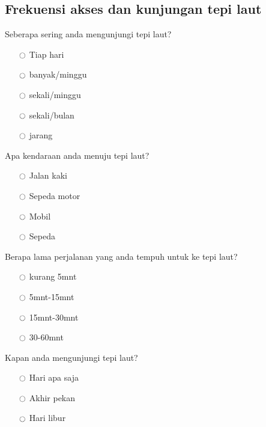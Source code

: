 \subsection*{Frekuensi akses dan kunjungan tepi laut}


Seberapa sering anda mengunjungi tepi laut?
\begin{multicols}{3}
\begin{itemize}
\item[$\ocircle$] Tiap hari
\item[$\ocircle$] banyak/minggu
\item[$\ocircle$] sekali/minggu
\item[$\ocircle$] sekali/bulan
\item[$\ocircle$] jarang
\end{itemize}
\end{multicols}

Apa kendaraan anda menuju tepi laut?
\begin{multicols}{3}
\begin{itemize}
\item[$\ocircle$] Jalan kaki
\item[$\ocircle$] Sepeda motor
\item[$\ocircle$] Mobil
\item[$\ocircle$] Sepeda
\end{itemize}
\end{multicols}

Berapa lama perjalanan yang anda tempuh untuk ke tepi laut?
\begin{multicols}{3}
\begin{itemize}
\item[$\ocircle$] kurang 5mnt
\item[$\ocircle$] 5mnt-15mnt
\item[$\ocircle$] 15mnt-30mnt
\item[$\ocircle$] 30-60mnt
\end{itemize}
\end{multicols}


Kapan anda mengunjungi tepi laut?
\begin{multicols}{3}
\begin{itemize}
\item[$\ocircle$] Hari apa saja
\item[$\ocircle$] Akhir pekan
\item[$\ocircle$] Hari libur
\end{itemize}
\end{multicols}


